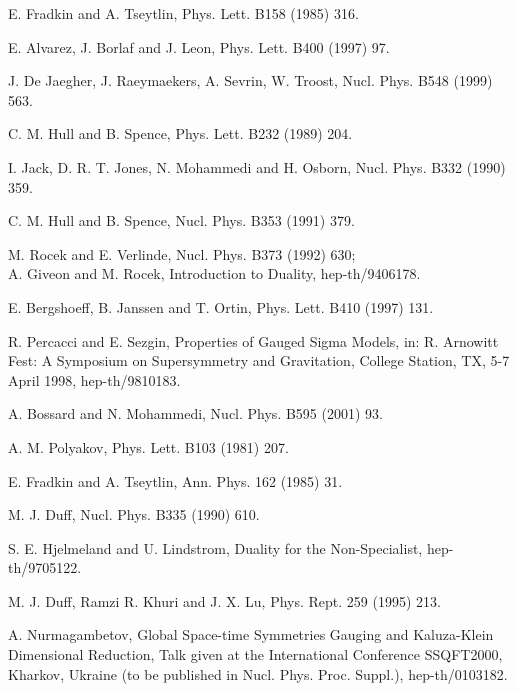 \documentclass[a4paper,11pt]{article}
\begin{document}
\begin{thebibliography}{99}
E. Fradkin and A. Tseytlin, Phys. Lett. B158 (1985) 316.

E. Alvarez, J. Borlaf and J. Leon, Phys. Lett. B400 (1997) 97.

J. De Jaegher, J. Raeymaekers, A. Sevrin, W. Troost, Nucl. Phys.
B548 (1999) 563.


C. M. Hull and B. Spence, Phys. Lett. B232 (1989) 204.

I. Jack, D. R. T. Jones, N. Mohammedi and H. Osborn, Nucl. Phys. B332 (1990)
359.

C. M. Hull and B. Spence, Nucl. Phys. B353 (1991) 379.

M. Rocek and E. Verlinde,  Nucl. Phys. B373 (1992) 630;\\
A. Giveon and M. Rocek, Introduction to Duality, hep-th/9406178.

E. Bergshoeff, B. Janssen and T. Ortin, Phys. Lett. B410 (1997) 131.

R. Percacci and E. Sezgin, Properties of Gauged Sigma Models,
in: R. Arnowitt Fest: A Symposium on Supersymmetry and
Gravitation, College Station, TX, 5-7 April 1998, hep-th/9810183.

A. Bossard and N. Mohammedi, Nucl. Phys. B595 (2001)
93.

A. M. Polyakov, Phys. Lett. B103 (1981) 207.

E. Fradkin and A. Tseytlin, Ann. Phys. 162 (1985) 31.

M. J. Duff, Nucl. Phys. B335 (1990) 610.

S. E. Hjelmeland and U. Lindstrom, Duality for the Non-Specialist,
hep-th/9705122.

M. J. Duff, Ramzi R. Khuri and J. X. Lu, Phys. Rept. 259 (1995) 213.

A. Nurmagambetov, Global Space-time Symmetries Gauging and Kaluza-Klein
Dimensional Reduction, Talk given at the International Conference SSQFT2000,
Kharkov, Ukraine (to be published in Nucl. Phys. Proc. Suppl.),
hep-th/0103182.

\end{thebibliography}
\end{document}
